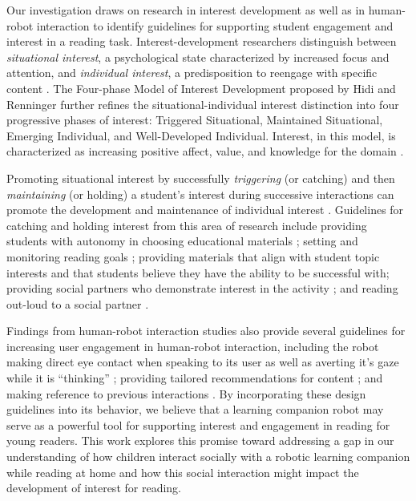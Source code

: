 \documentclass{sigchi}
\begin{document}
Our investigation draws on research in interest development as well as in human-robot interaction to identify guidelines for supporting student engagement and interest in a reading task. Interest-development researchers distinguish between \textit{situational interest}, a psychological state characterized by increased focus and attention, and \textit{individual interest}, a predisposition to reengage with specific content \cite{Krapp:1999}. The Four-phase Model of Interest Development proposed by Hidi and Renninger \cite{Hidi:2006} further refines the situational-individual interest distinction into four progressive phases of interest: Triggered Situational, Maintained Situational, Emerging Individual, and Well-Developed Individual. Interest, in this model, is characterized as increasing positive affect, value, and knowledge for the domain \cite{Renninger:2011}.

Promoting situational interest by successfully \textit{triggering} (or catching) and then \textit{maintaining} (or holding) a student's interest during successive interactions can promote the development and maintenance of individual interest \cite{Hidi:2006, Mitchell:1993}. Guidelines for catching and holding interest from this area of research include providing students with autonomy in choosing educational materials \cite{Jones:2011}; setting and monitoring reading goals \cite{Cabral:2015}; providing materials that align with student topic interests \cite{Ainley:2002} and that students believe they have the ability to be successful with; providing social partners who demonstrate interest in the activity \cite{Sansone:2005}; and reading out-loud to a social partner \cite{Rasinski:2003}. 

Findings from human-robot interaction studies also provide several guidelines for increasing user engagement in human-robot interaction, including the robot making direct eye contact when speaking to its user \cite{mutlu2006storytelling, mutlu2012conversational} as well as averting it's gaze while it is ``thinking'' \cite{Andrist:2014}; providing tailored recommendations for content \cite{Lim:2013}; and making reference to previous interactions \cite{Leite:2009}. By incorporating these design guidelines into its behavior, we believe that a learning companion robot may serve as a powerful tool for supporting interest and engagement in reading for young readers. {\color{Purple}This work explores this promise toward addressing a gap in our understanding of how children interact socially with a robotic learning companion while reading at home and how this social interaction might impact the development of interest for reading.}
\end{document}
